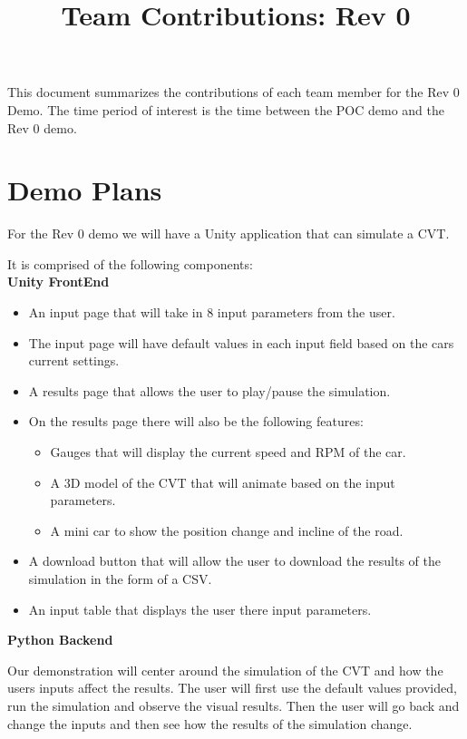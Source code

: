 \documentclass{article}
\title{Team Contributions: Rev 0\\\progname}
\author{\authname}
\date{}
\begin{document}
\maketitle

This document summarizes the contributions of each team member for the Rev 0
Demo.  The time period of interest is the time between the POC demo and the Rev
0 demo.

\section{Demo Plans}

For the Rev 0 demo we will have a Unity application that can simulate a CVT.

It is comprised of the following components:\\

\textbf{Unity FrontEnd}

\begin{itemize}
  \item An input page that will take in 8 input parameters from the user.
  \item The input page will have default values in each input field based on the cars current settings.
  \item A results page that allows the user to play/pause the simulation.
  \item On the results page there will also be the following features:
  \begin{itemize}
    \item Gauges that will display the current speed and RPM of the car.
    \item A 3D model of the CVT that will animate based on the input parameters.
    \item A mini car to show the position change and incline of the road.
  \end{itemize}
  \item A download button that will allow the user to download the results of the simulation in the form of a CSV.
  \item An input table that displays the user there input parameters.
\end{itemize}

\textbf{Python Backend}

Our demonstration will center around the simulation of the CVT and how the users inputs affect the results.
The user will first use the default values provided, run the simulation and observe the visual results.
Then the user will go back and change the inputs and then see how the results of the simulation change. 
\end{document}
